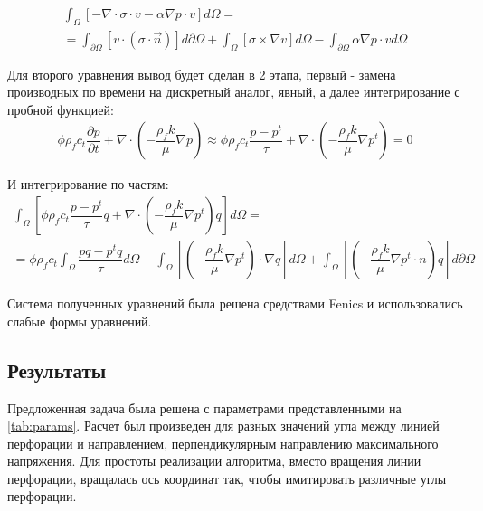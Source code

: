 \begin{equation*}
	\begin{multlined}
		\int_{\Omega} \left [ - \nabla \cdot \sigma \cdot v - \alpha \nabla p \cdot v \right ] d \Omega = \\
		= \int_{\partial \Omega} \left [ v \cdot \left ( \sigma \cdot \vec{n} \right ) \right ] d \partial \Omega + \int_{\Omega} \left [ \sigma \times \nabla v \right ] d \Omega - \int_{\partial \Omega} \alpha \nabla p \cdot v d \Omega
	\end{multlined}
\end{equation*}

Для второго уравнения вывод будет сделан в 2 
этапа, первый - замена производных по времени на дискретный аналог, явный, а далее интегрирование с пробной функцией:
\begin{equation*}
	\begin{multlined}
		\phi \rho_f c_t \dfrac{\partial p}{\partial t} + \nabla \cdot \left ( -\dfrac{\rho_f k}{\mu} \nabla p \right ) \approx \phi \rho_f c_t  \dfrac{p - p^t}{\tau} + \nabla \cdot \left ( -\dfrac{\rho_f k}{\mu} \nabla p^t \right ) = 0
	\end{multlined}
\end{equation*}

И интегрирование по частям:
\begin{equation*}
	\begin{multlined}
		\int_{\Omega} \left [ \phi \rho_f c_t  \dfrac{p - p^t}{\tau} q + \nabla \cdot \left ( -\dfrac{\rho_f k}{\mu} \nabla p^t \right ) q \right ] d \Omega = 	\\[10pt] = \phi \rho_f c_t \int_{\Omega} \dfrac{p q - p^t q}{\tau} d \Omega - \int_{\Omega } \left [ \left ( -\dfrac{\rho_f k}{\mu} \nabla p^t \right ) \cdot \nabla q \right ] d \Omega + \int_{\Omega } \left [ \left ( -\dfrac{\rho_f k}{\mu} \nabla p^t \cdot n\right ) q \right ] d \partial \Omega
	\end{multlined}
\end{equation*}


Система полученных уравнений была решена средствами Fenics и использовались слабые формы уравнений.

\subsection*{Результаты}

Предложенная задача была решена с параметрами представленными на \ref{tab:params}. Расчет был произведен для разных значений угла между линией перфорации и направлением, перпендикулярным направлению максимального напряжения. Для простоты реализации алгоритма, вместо вращения линии перфорации, вращалась ось координат так, чтобы имитировать различные углы перфорации. 

